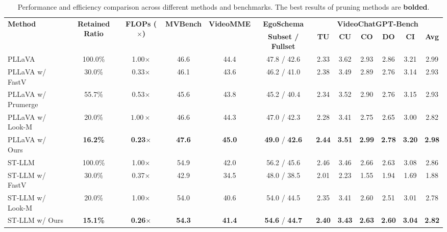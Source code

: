\documentclass{article} %
\begin{document}
\begin{table}[t]
\centering
\setlength{\tabcolsep}{2pt} %
\scriptsize %
\caption{Performance and efficiency comparison across different methods and benchmarks. The best results of pruning methods are \textbf{bolded}.}
\begin{tabular}{@{}lccccc|cccccc@{}}
\toprule
\multirow{2}{*}{\textbf{Method}} & \multirow{2}{*}{\textbf{Retained Ratio}} & \multirow{2}{*}{\textbf{FLOPs ($\times$)}} & \multirow{2}{*}{\textbf{MVBench}} & \multirow{2}{*}{\textbf{VideoMME}} & \multicolumn{1}{c}{\textbf{EgoSchema}} & \multicolumn{6}{c}{\textbf{VideoChatGPT-Bench}} \\
\cmidrule(lr){6-6} \cmidrule(lr){7-12}
 & & & & & \textbf{Subset / Fullset} & \textbf{TU} & \textbf{CU} & \textbf{CO} & \textbf{DO} & \textbf{CI} & \textbf{Avg} \\
\midrule
PLLaVA                   & 100.0\% & 1.00$\times$ & 46.6  & 44.4  & 47.8 / 42.6 & 2.33 & 3.62 & 2.93 & 2.86 & 3.21 & 2.99 \\
PLLaVA w/ FastV          & 30.0\%  & 0.33$\times$ & 46.1  & 43.6  & 46.2 / 41.0 & 2.38 & 3.49 & 2.89 & 2.76 & 3.14 & 2.93 \\
PLLaVA w/ Prumerge       & 55.7\%  & 0.53$\times$ & 45.6  & 43.8  & 45.2 / 40.4 & 2.34 & 3.52 & 2.90 & 2.76 & 3.15 & 2.93 \\
PLLaVA w/ Look-M         & 20.0\%  & $1.00\times$ & 46.6  & 44.3  & 47.0 / 42.3 & 2.28 & 3.41 & 2.75 & 2.65 & 3.00 & 2.82 \\
\rowcolor[HTML]{E3F2FD} %
PLLaVA w/ Ours           & \textbf{16.2\%}  & \textbf{0.23$\times$} & \textbf{47.6}  & \textbf{45.0}  & \textbf{49.0} / \textbf{42.6} & \textbf{2.44} & \textbf{3.51} & \textbf{2.99} & \textbf{2.78} & \textbf{3.20} & \textbf{2.98} \\
\midrule
ST-LLM                   & 100.0\% & 1.00$\times$ & 54.9  & 42.0  & 56.2 / 45.6 & 2.46 & 3.46 & 2.66 & 2.63 & 3.08 & 2.86 \\
ST-LLM w/ FastV          & 30.0\%  & 0.37$\times$ & 42.9  & 34.5  & 48.0 / 38.5 & 2.01 & 2.23 & 1.55 & 1.94 & 1.69 & 1.88 \\
ST-LLM w/ Look-M         & 20.0\%  & 1.00$\times$ & 54.0  & 40.6  & 54.0 / 44.5 & 2.35 & 3.41 & 2.60 & 2.51 & 3.01 & 2.78 \\
\rowcolor[HTML]{E3F2FD} ST-LLM w/ Ours        & \textbf{15.1\%}  & \textbf{0.26$\times$} & \textbf{54.3}  & \textbf{41.4}  & \textbf{54.6} / \textbf{44.7} & \textbf{2.40} & \textbf{3.43} & \textbf{2.63} & \textbf{2.60} & \textbf{3.04} & \textbf{2.82} \\

\end{tabular}
\end{table}
\end{document}
